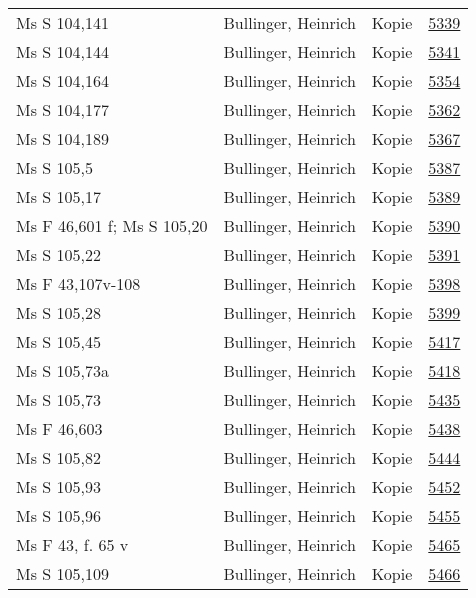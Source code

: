 \documentclass[10pt,a4paper,landscape]{report}
\begin{document}
\begin{longtable}{p{16cm}p{4cm}lr}
Ms S 104,141	&	Bullinger, Heinrich	&	Kopie	&	\href{http://130.60.24.72/assignment/5339}{5339}\\
Ms S 104,144	&	Bullinger, Heinrich	&	Kopie	&	\href{http://130.60.24.72/assignment/5341}{5341}\\
Ms S 104,164	&	Bullinger, Heinrich	&	Kopie	&	\href{http://130.60.24.72/assignment/5354}{5354}\\
Ms S 104,177	&	Bullinger, Heinrich	&	Kopie	&	\href{http://130.60.24.72/assignment/5362}{5362}\\
Ms S 104,189	&	Bullinger, Heinrich	&	Kopie	&	\href{http://130.60.24.72/assignment/5367}{5367}\\
Ms S 105,5	&	Bullinger, Heinrich	&	Kopie	&	\href{http://130.60.24.72/assignment/5387}{5387}\\
Ms S 105,17	&	Bullinger, Heinrich	&	Kopie	&	\href{http://130.60.24.72/assignment/5389}{5389}\\
Ms F 46,601 f; Ms S 105,20	&	Bullinger, Heinrich	&	Kopie	&	\href{http://130.60.24.72/assignment/5390}{5390}\\
Ms S 105,22	&	Bullinger, Heinrich	&	Kopie	&	\href{http://130.60.24.72/assignment/5391}{5391}\\
Ms F 43,107v-108	&	Bullinger, Heinrich	&	Kopie	&	\href{http://130.60.24.72/assignment/5398}{5398}\\
Ms S 105,28	&	Bullinger, Heinrich	&	Kopie	&	\href{http://130.60.24.72/assignment/5399}{5399}\\
Ms S 105,45	&	Bullinger, Heinrich	&	Kopie	&	\href{http://130.60.24.72/assignment/5417}{5417}\\
Ms S 105,73a	&	Bullinger, Heinrich	&	Kopie	&	\href{http://130.60.24.72/assignment/5418}{5418}\\
Ms S 105,73	&	Bullinger, Heinrich	&	Kopie	&	\href{http://130.60.24.72/assignment/5435}{5435}\\
Ms F 46,603	&	Bullinger, Heinrich	&	Kopie	&	\href{http://130.60.24.72/assignment/5438}{5438}\\
Ms S 105,82	&	Bullinger, Heinrich	&	Kopie	&	\href{http://130.60.24.72/assignment/5444}{5444}\\
Ms S 105,93	&	Bullinger, Heinrich	&	Kopie	&	\href{http://130.60.24.72/assignment/5452}{5452}\\
Ms S 105,96	&	Bullinger, Heinrich	&	Kopie	&	\href{http://130.60.24.72/assignment/5455}{5455}\\
Ms F 43, f. 65 v	&	Bullinger, Heinrich	&	Kopie	&	\href{http://130.60.24.72/assignment/5465}{5465}\\
Ms S 105,109	&	Bullinger, Heinrich	&	Kopie	&	\href{http://130.60.24.72/assignment/5466}{5466}\\

\end{longtable}
\end{document}
